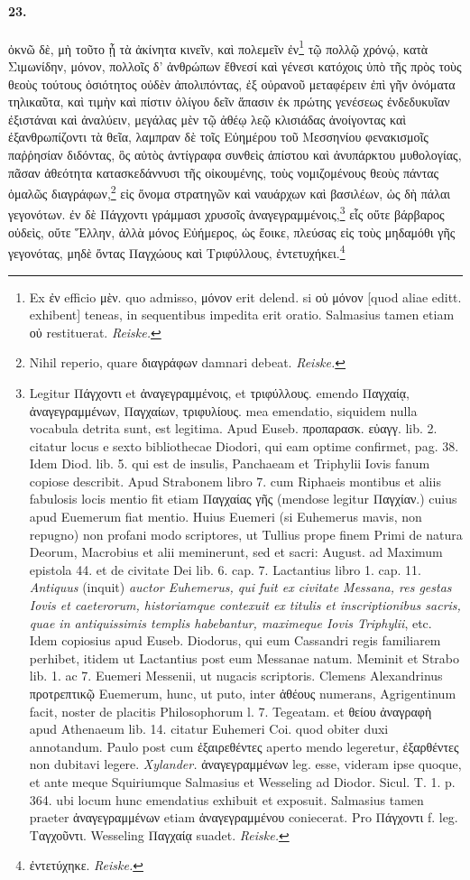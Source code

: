 \documentclass[a4paper, 11pt, oneside, polutonikogreek, german]{article}
\begin{document}
\paragraph{23.}
ὀκνῶ δὲ, μὴ τοῦτο ᾖ τὰ ἀκίνητα κινεῖν, καὶ πολεμεῖν ἐν\footnote{Ex ἐν efficio μὲν. quo admisso, μόνον erit delend. si οὐ μόνον [quod aliae editt. exhibent] teneas, in sequentibus impedita erit oratio. Salmasius tamen etiam οὐ restituerat. \emph{Reiske.}} τῷ πολλῷ χρόνῴ, κατὰ Σιμωνίδην, μόνον, πολλοῖς δ' ἀνθρώπων ἔθνεσί καὶ γένεσι κατόχοις ὑπὸ τῆς πρὸς τοὺς θεοὺς τούτους ὁσιότητος οὐδὲν ἀπολιπόντας, ἐξ οὐρανοῦ μεταφέρειν ἐπὶ γῆν ὀνόματα τηλικαῦτα, καὶ τιμὴν καὶ πίστιν ὀλίγου δεῖν ἅπασιν ἐκ πρώτης γενέσεως ἐνδεδυκυῖαν ἐξιστάναι καὶ ἀναλύειν, μεγάλας μὲν τῷ ἀθέῳ λεῷ κλισιάδας ἀνοίγοντας καὶ ἐξανθρωπίζοντι τὰ θεῖα, λαμπραν δὲ τοῖς Εὐημέρου τοῦ Μεσσηνίου φενακισμοῖς παῤῥησίαν διδόντας, ὃς αὐτὸς ἀντίγραφα συνθεὶς ἀπίστου καὶ ἀνυπάρκτου μυθολογίας, πᾶσαν ἀθεότητα κατασκεδάννυσι τῆς οἰκουμένης, τοὺς νομιζομένους θεοὺς πάντας ὁμαλῶς διαγράφων,\footnote{Nihil reperio, quare διαγράφων damnari debeat. \emph{Reiske.}} εἰς ὄνομα στρατηγῶν καὶ ναυάρχων καὶ βασιλέων, ὡς δὴ πάλαι γεγονότων. ἐν δὲ Πάγχοντι γράμμασι χρυσοῖς ἀναγεγραμμένοις,\footnote{Legitur Πάγχοντι et ἀναγεγραμμένοις, et τριφύλλους. emendo Παγχαίᾳ, ἀναγεγραμμένων, Παγχαίων, τριφυλίους. mea emendatio, siquidem nulla vocabula detrita sunt, est legitima. Apud Euseb. προπαρασκ. εὐαγγ. lib. 2. citatur locus e sexto bibliothecae Diodori, qui eam optime confirmet, pag. 38. Idem Diod. lib. 5. qui est de insulis, Panchaeam et Triphylii Iovis fanum copiose describit. Apud Strabonem libro 7. cum Riphaeis montibus et aliis fabulosis locis mentio fit etiam Παγχαίας γῆς (mendose legitur Παγχίαν.) cuius apud Euemerum fiat mentio. Huius Euemeri (si Euhemerus mavis, non repugno) non profani modo scriptores, ut Tullius prope finem Primi de natura Deorum, Macrobius et alii meminerunt, sed et sacri: August. ad Maximum epistola 44. et de civitate Dei lib. 6. cap. 7. Lactantius libro 1. cap. 11. \emph{Antiquus} (inquit) \emph{auctor Euhemerus, qui fuit ex civitate Messana, res gestas Iovis et caeterorum, historiamque contexuit ex titulis et inscriptionibus sacris, quae in antiquissimis templis habebantur, maximeque Iovis Triphylii}, etc. Idem copiosius apud Euseb. Diodorus, qui eum Cassandri regis familiarem perhibet, itidem ut Lactantius post eum Messanae natum. Meminit et Strabo lib. 1. ac 7. Euemeri Messenii, ut nugacis scriptoris. Clemens Alexandrinus προτρεπτικῷ Euemerum, hunc, ut puto, inter ἀθέους numerans, Agrigentinum facit, noster de placitis Philosophorum l. 7. Tegeatam. et θείου ἀναγραφὴ apud Athenaeum lib. 14. citatur Euhemeri Coi. quod obiter duxi annotandum. Paulo post cum ἐξαιρεθέντες aperto mendo legeretur, ἐξαρθέντες non dubitavi legere. \emph{Xylander.} ἀναγεγραμμένων leg. esse, videram ipse quoque, et ante meque Squiriumque Salmasius et Wesseling ad Diodor. Sicul. T. 1. p. 364. ubi locum hunc emendatius exhibuit et exposuit. Salmasius tamen praeter ἀναγεγραμμένων etiam ἀναγεγραμμένου coniecerat. Pro Πάγχοντι f. leg. Ταγχοῦντι. Wesseling Παγχαίᾳ suadet. \emph{Reiske.}} εἷς οὔτε βάρβαρος οὐδεὶς, οὔτε Ἕλλην, ἀλλὰ μόνος Εὐήμερος, ὡς ἔοικε, πλεύσας εἰς τοὺς μηδαμόθι γῆς γεγονότας, μηδὲ ὄντας Παγχώους καὶ Τριφύλλους, ἐντετυχήκει.\footnote{ἐντετύχηκε. \emph{Reiske.}}
\end{document}
